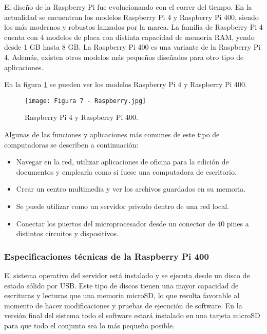 El diseño de la Raspberry Pi fue evolucionando con el correr del tiempo. En la actualidad se encuentran los modelos Raspberry Pi 4 y Raspberry Pi 400, siendo los más modernos y robustos lanzados por la marca. La familia de Raspberry Pi 4 cuenta con 4 modelos de placa con distinta capacidad de memoria RAM, yendo desde 1 GB hasta 8 GB. La Raspberry Pi 400 es una variante de la Raspberry Pi 4. Además, existen otros modelos más pequeños diseñados para otro tipo de aplicaciones.

En la figura \ref{fig:7} se pueden ver los modelos Raspberry Pi 4 y Raspberry Pi 400.

\begin{figure}[h]
\centering
\texttt{[image: Figura 7 - Raspberry.jpg]}
\caption[Raspberry Pi 4 y Raspberry Pi 400]{Raspberry Pi 4 y Raspberry Pi 400. \footnotemark}
\label{fig:7}
\end{figure}

Algunas de las funciones y aplicaciones más comunes de este tipo de computadoras se describen a continuación:

\begin{itemize}
	\item Navegar en la red, utilizar aplicaciones de oficina para la edición de documentos y emplearla como si fuese una computadora de escritorio.
	\item Crear un centro multimedia y ver los archivos guardados en su memoria.
	\item Se puede utilizar como un servidor privado dentro de una red local.
	\item Conectar los puertos del microprocesador desde un conector de 40 pines a distintos circuitos y dispositivos.
\end{itemize}

\subsubsection{Especificaciones técnicas de la Raspberry Pi 400}

El sistema operativo del servidor está instalado y se ejecuta desde un disco de estado sólido por USB. Este tipo de discos tienen una mayor capacidad de escrituras y lecturas que una memoria microSD, lo que resulta favorable al momento de hacer modificaciones y pruebas de ejecución de software. En la versión final del sistema todo el software estará instalado en una tarjeta microSD para que todo el conjunto sea lo más pequeño posible.

